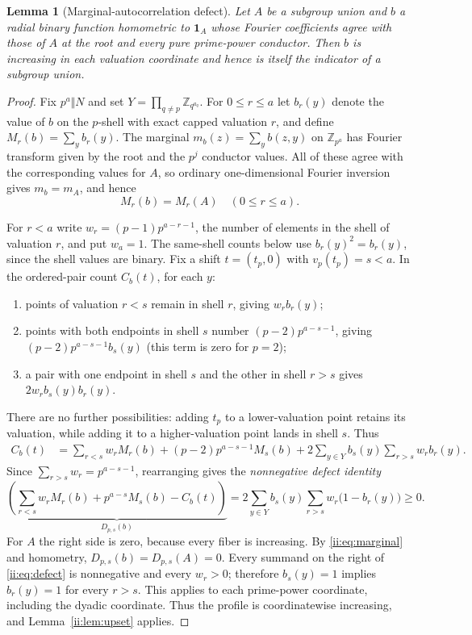 \documentclass[11pt]{article}
\numberwithin{equation}{section}
\newtheorem{lemma}[theorem]{Lemma}
\theoremstyle{definition}
\theoremstyle{remark}
\newcommand{\one}{\mathbf 1}
\begin{document}
\begin{lemma}[Marginal-autocorrelation defect]\label{ii:lem:defect}
Let $A$ be a subgroup union and $b$ a radial binary function homometric to $\one_A$ whose Fourier coefficients agree with those of $A$ at the root and every pure prime-power conductor.  Then $b$ is increasing in each valuation coordinate and hence is itself the indicator of a subgroup union.
\end{lemma}
\begin{proof}
Fix $p^a\Vert N$ and set $Y=\prod_{q\ne p}\mathbb Z_{q^{a_q}}$.  For $0\le r\le a$ let $b_r(y)$ denote the value of $b$ on the $p$-shell with exact capped valuation $r$, and define $M_r(b)=\sum_y b_r(y)$.  The marginal $m_b(z)=\sum_y b(z,y)$ on $\mathbb Z_{p^a}$ has Fourier transform given by the root and the $p^j$ conductor values.  All of these agree with the corresponding values for $A$, so ordinary one-dimensional Fourier inversion gives $m_b=m_A$, and hence
\begin{equation}\label{ii:eq:marginal}
 M_r(b)=M_r(A)\quad(0\le r\le a).
\end{equation}

For $r<a$ write $w_r=(p-1)p^{a-r-1}$, the number of elements in the shell of valuation $r$, and put $w_a=1$.  The same-shell counts below use $b_r(y)^2=b_r(y)$, since the shell values are binary.  Fix a shift $t=(t_p,0)$ with $v_p(t_p)=s<a$.  In the ordered-pair count $C_b(t)$, for each $y$:
\begin{enumerate}[label=(\roman*),nosep]
 \item points of valuation $r<s$ remain in shell $r$, giving $w_rb_r(y)$;
 \item points with both endpoints in shell $s$ number $(p-2)p^{a-s-1}$, giving $(p-2)p^{a-s-1}b_s(y)$ (this term is zero for $p=2$);
 \item a pair with one endpoint in shell $s$ and the other in shell $r>s$ gives $2w_rb_s(y)b_r(y)$.
\end{enumerate}
There are no further possibilities: adding $t_p$ to a lower-valuation point retains its valuation, while adding it to a higher-valuation point lands in shell $s$.  Thus
\begin{align}
 C_b(t)&=\sum_{r<s}w_rM_r(b)+(p-2)p^{a-s-1}M_s(b)
          +2\sum_{y\in Y}b_s(y)\sum_{r>s}w_rb_r(y).\label{ii:eq:shellcorr}
\end{align}
Since $\sum_{r>s}w_r=p^{a-s-1}$, rearranging gives the \emph{nonnegative defect identity}
\begin{equation}\label{ii:eq:defect}
 \underbrace{\left(\sum_{r<s}w_rM_r(b)+p^{a-s}M_s(b)-C_b(t)\right)}_{D_{p,s}(b)}
 =2\sum_{y\in Y}b_s(y)\sum_{r>s}w_r\bigl(1-b_r(y)\bigr)\ge0.
\end{equation}
For $A$ the right side is zero, because every fiber is increasing.  By \eqref{ii:eq:marginal} and homometry, $D_{p,s}(b)=D_{p,s}(A)=0$.  Every summand on the right of \eqref{ii:eq:defect} is nonnegative and every $w_r>0$; therefore $b_s(y)=1$ implies $b_r(y)=1$ for every $r>s$.  This applies to each prime-power coordinate, including the dyadic coordinate. Thus the profile is coordinatewise increasing, and Lemma~\ref{ii:lem:upset} applies.\qedhere
\end{proof}
\end{document}
